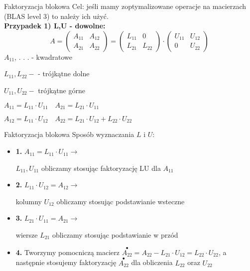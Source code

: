 \begin{frame}{Faktoryzacja blokowa}
Cel: jeśli mamy zoptymalizowane operacje na macierzach (BLAS level 3) to należy ich użyć.\\

\textbf{Przypadek 1) L,U - dowolne: }
$$
A=\left(\begin{array}{ll}
A_{11} & A_{12}\\
A_{21} & A_{22}
\end{array}\right)=\left(\begin{array}{ll}
L_{11} & 0\\
L_{21} & L_{22}
\end{array}\right)\cdot\left(\begin{array}{ll}
U_{11} & U_{12}\\
0 & U_{22}
\end{array}\right)
$$
$A_{11}$, . . . - kwadratowe

$L_{11}, L_{22}-$ - trójkątne dolne 

$U_{11}, U_{22}-$ trójkątne górne
\begin{flushright}
$
A_{11}=L_{11}\cdot U_{11}\quad A_{21}=L_{21}\cdot U_{11}
$
\end{flushright}
\begin{flushright}
$
A_{12}=L_{11}\cdot U_{12}\quad A_{22}=L_{21}\cdot U_{12}+L_{22}\cdot U_{22}
$
\end{flushright}

\end{frame}
\begin{frame}{Faktoryzacja blokowa}
Sposób wyznaczania $L$ i $U$:

\begin{itemize}
\item   \textbf{1.} $A_{11}=L_{11}\cdot U_{11}\rightarrow$

$L_{11}, U_{11}$ obliczamy stosując faktoryzację LU dla $A_{11}$
\item \textbf{2.} $ L_{11}\cdot U_{12}=A_{12}\rightarrow$

kolumny $U_{12}$ obliczamy stosując podstawianie wsteczne

\item \textbf{3.} $L_{21}\cdot U_{11}=A_{21}\rightarrow$

wiersze $L_{21}$ obliczamy stosując podstawianie w przód  
\item \textbf{4.}
Tworzymy pomocniczą macierz $\overset{\bullet}{A_{22}}=A_{22}-L_{21}\cdot U_{12}=L_{22}\cdot U_{22}$, a następnie  stosujemy faktoryzację $\overset{\bullet}{A_{22}}$ dla obliczenia $L_{22}$ oraz $U_{22}$
\end{itemize}

\end{frame}
